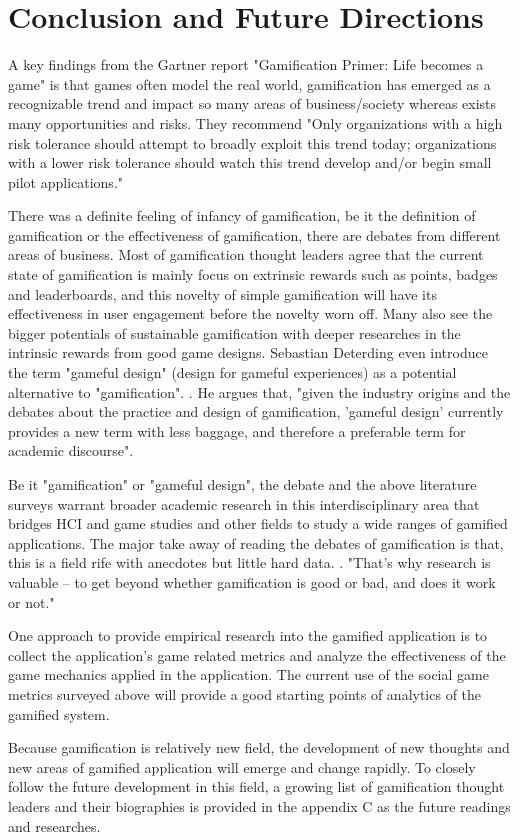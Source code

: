 \chapter{Conclusion and Future Directions}

A key findings from the Gartner report "Gamification Primer: Life becomes a game" \cite {gartner2010} is that games often model the real world, gamification has emerged as a recognizable trend and impact so many areas of business/society whereas exists many opportunities and risks. They recommend "Only organizations with a high risk tolerance should attempt to broadly exploit this trend today; organizations with a lower risk tolerance should watch this trend develop and/or begin small pilot applications."

There was a definite feeling of infancy of gamification, be it the definition of gamification or the effectiveness of gamification, there are debates from different areas of business.  Most of gamification thought leaders agree that the current state of gamification is mainly focus on extrinsic rewards such as points, badges and leaderboards,  and this novelty of simple gamification will have its effectiveness in user engagement before the novelty worn off. Many also see the bigger potentials of sustainable gamification with deeper researches in the intrinsic rewards from good game designs. Sebastian Deterding even introduce the term "gameful design" (design  for  gameful  experiences)  as  a  potential  alternative  to  "gamification". \cite {Deterding2011mt}. He argues that,  "given the industry origins and the debates about the practice and design of gamification, 'gameful design' currently provides a new term with less baggage, and therefore a preferable term for academic discourse".

Be it "gamification" or "gameful design", the debate and the above literature surveys warrant broader academic research in this interdisciplinary area that bridges HCI and game studies and other fields to study a wide ranges of gamified applications. The major take away of reading the debates of gamification is that, this is a field rife with anecdotes but little hard data. \cite {Wharton2011}.  "That's why research is valuable -- to get beyond whether gamification is good or bad, and does it work or not." 

One approach to provide empirical research into the gamified application is to collect the application's game related metrics and analyze the effectiveness of the game mechanics applied in the application. The current use of the social game metrics surveyed above will provide a good starting points of analytics of the gamified system.

Because gamification is relatively new field, the development of new thoughts and new areas of gamified application will emerge and change rapidly. To closely follow the future development in this field, a growing list of gamification thought leaders and their biographies is provided in the appendix C as the future readings and researches.
